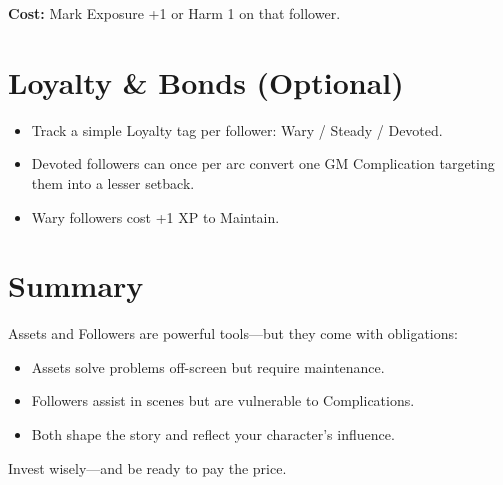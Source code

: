 \textbf{Cost:} Mark Exposure +1 or Harm 1 on that follower.

\section{Loyalty \& Bonds (Optional)}

\begin{itemize}
  \item Track a simple Loyalty tag per follower: Wary / Steady / Devoted.
  \item Devoted followers can once per arc convert one GM Complication targeting them into a lesser setback.
  \item Wary followers cost +1 XP to Maintain.
\end{itemize}

\section{Summary}

Assets and Followers are powerful tools—but they come with obligations:

\begin{itemize}
  \item Assets solve problems off-screen but require maintenance.
  \item Followers assist in scenes but are vulnerable to Complications.
  \item Both shape the story and reflect your character's influence.
\end{itemize}

Invest wisely—and be ready to pay the price.
